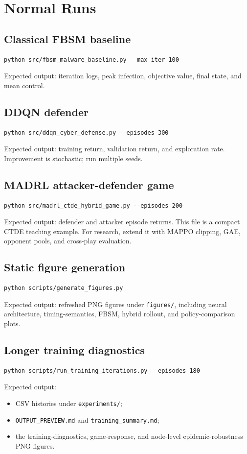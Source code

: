 \documentclass[11pt,a4paper]{article}
\begin{document}
\section{Normal Runs}
\subsection{Classical FBSM baseline}
\begin{lstlisting}[style=pythonstyle]
python src/fbsm_malware_baseline.py --max-iter 100
\end{lstlisting}
Expected output: iteration logs, peak infection, objective value, final state, and mean control.

\subsection{DDQN defender}
\begin{lstlisting}[style=pythonstyle]
python src/ddqn_cyber_defense.py --episodes 300
\end{lstlisting}
Expected output: training return, validation return, and exploration rate. Improvement is stochastic; run multiple seeds.

\subsection{MADRL attacker-defender game}
\begin{lstlisting}[style=pythonstyle]
python src/madrl_ctde_hybrid_game.py --episodes 200
\end{lstlisting}
Expected output: defender and attacker episode returns. This file is a compact CTDE teaching example. For research, extend it with MAPPO clipping, GAE, opponent pools, and cross-play evaluation.

\subsection{Static figure generation}
\begin{lstlisting}[style=pythonstyle]
python scripts/generate_figures.py
\end{lstlisting}
Expected output: refreshed PNG figures under \texttt{figures/}, including neural architecture, timing-semantics, FBSM, hybrid rollout, and policy-comparison plots.

\subsection{Longer training diagnostics}
\begin{lstlisting}[style=pythonstyle]
python scripts/run_training_iterations.py --episodes 180
\end{lstlisting}
Expected output:
\begin{itemize}
\item CSV histories under \texttt{experiments/};
\item \texttt{OUTPUT\_PREVIEW.md} and \texttt{training\_summary.md};
\item the training-diagnostics, game-response, and node-level epidemic-robustness PNG figures.
\end{itemize}
\end{document}
